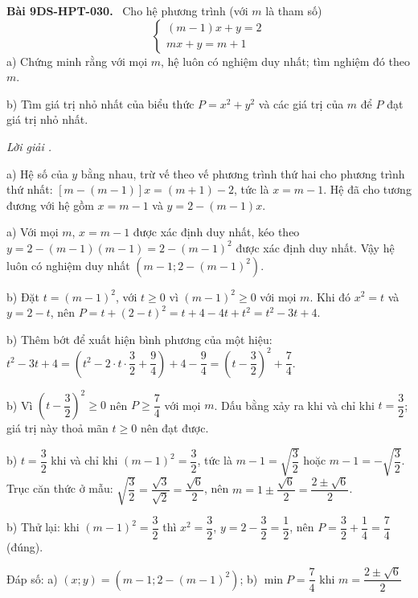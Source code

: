 \documentclass[12pt,a4paper]{article}
\newenvironment{problem}[1][]{\par\medskip\noindent\textbf{Bài #1.}\ }{\par}
\newenvironment{solution}[1][]{\par\noindent\textit{Lời giải #1.}\par}{\par}
\begin{document}
\begin{problem}[9DS-HPT-030]
Cho hệ phương trình (với $m$ là tham số)
\[ \begin{cases} (m - 1)x + y = 2 \\ mx + y = m + 1 \end{cases} \]
a) Chứng minh rằng với mọi $m$, hệ luôn có nghiệm duy nhất; tìm nghiệm đó theo $m$.

b) Tìm giá trị nhỏ nhất của biểu thức $P = x^2 + y^2$ và các giá trị của $m$ để $P$ đạt giá trị nhỏ nhất.

\begin{solution}
a) Hệ số của $y$ bằng nhau, trừ vế theo vế phương trình thứ hai cho phương trình thứ nhất: $\left[m - (m - 1)\right]x = (m + 1) - 2$, tức là $x = m - 1$. Hệ đã cho tương đương với hệ gồm $x = m - 1$ và $y = 2 - (m - 1)x$.

a) Với mọi $m$, $x = m - 1$ được xác định duy nhất, kéo theo $y = 2 - (m - 1)(m - 1) = 2 - (m - 1)^2$ được xác định duy nhất. Vậy hệ luôn có nghiệm duy nhất $\left(m - 1; 2 - (m - 1)^2\right)$.

b) Đặt $t = (m - 1)^2$, với $t \geq 0$ vì $(m - 1)^2 \geq 0$ với mọi $m$. Khi đó $x^2 = t$ và $y = 2 - t$, nên $P = t + (2 - t)^2 = t + 4 - 4t + t^2 = t^2 - 3t + 4$.

b) Thêm bớt để xuất hiện bình phương của một hiệu: $t^2 - 3t + 4 = \left(t^2 - 2 \cdot t \cdot \dfrac{3}{2} + \dfrac{9}{4}\right) + 4 - \dfrac{9}{4} = \left(t - \dfrac{3}{2}\right)^2 + \dfrac{7}{4}$.

b) Vì $\left(t - \dfrac{3}{2}\right)^2 \geq 0$ nên $P \geq \dfrac{7}{4}$ với mọi $m$. Dấu bằng xảy ra khi và chỉ khi $t = \dfrac{3}{2}$; giá trị này thoả mãn $t \geq 0$ nên đạt được.

b) $t = \dfrac{3}{2}$ khi và chỉ khi $(m - 1)^2 = \dfrac{3}{2}$, tức là $m - 1 = \sqrt{\dfrac{3}{2}}$ hoặc $m - 1 = -\sqrt{\dfrac{3}{2}}$. Trục căn thức ở mẫu: $\sqrt{\dfrac{3}{2}} = \dfrac{\sqrt{3}}{\sqrt{2}} = \dfrac{\sqrt{6}}{2}$, nên $m = 1 \pm \dfrac{\sqrt{6}}{2} = \dfrac{2 \pm \sqrt{6}}{2}$.

b) Thử lại: khi $(m - 1)^2 = \dfrac{3}{2}$ thì $x^2 = \dfrac{3}{2}$, $y = 2 - \dfrac{3}{2} = \dfrac{1}{2}$, nên $P = \dfrac{3}{2} + \dfrac{1}{4} = \dfrac{7}{4}$ (đúng).

Đáp số: a) $\boxed{(x; y) = \left(m - 1; 2 - (m - 1)^2\right)}$; b) $\boxed{\min P = \dfrac{7}{4} \text{ khi } m = \dfrac{2 \pm \sqrt{6}}{2}}$
\end{solution}
\end{problem}
\end{document}
